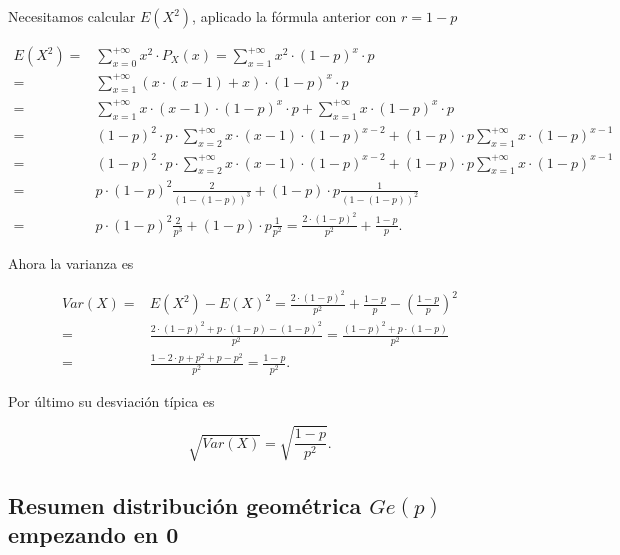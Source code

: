 \documentclass[
  letterpaper,
  DIV=11,
  numbers=noendperiod]{scrreprt}
\begin{document}
Necesitamos calcular \(E(X^2)\), aplicado la fórmula anterior con
\(r=1-p\)

\begin{align*}
E(X^2)
=&\sum_{x=0}^{+\infty} x^2\cdot P_X(x)=\sum_{x=1}^{+\infty} x^2\cdot (1-p)^x\cdot p
\\
=& 
\sum_{x=1}^{+\infty} (x\cdot (x-1)+x)\cdot (1-p)^{x}\cdot p\\
=&
 \sum_{x=1}^{+\infty} x\cdot (x-1)\cdot (1-p)^{x}\cdot p + \sum_{x=1}^{+\infty} x \cdot (1-p)^{x}\cdot p\\
=&
 (1-p)^{2}\cdot p\cdot \sum_{x=2}^{+\infty} x\cdot (x-1)\cdot (1-p)^{x-2} + (1-p)\cdot p\sum_{x=1}^{+\infty} x \cdot (1-p)^{x-1}\\ 
=&
 (1-p)^{2}\cdot p\cdot \sum_{x=2}^{+\infty} x\cdot (x-1)\cdot (1-p)^{x-2}
 +(1-p)\cdot p\sum_{x=1}^{+\infty} x \cdot (1-p)^{x-1}\\
=&
 p\cdot (1-p)^2 \frac{2}{(1-(1-p))^3}+ (1-p)\cdot p \frac{1}{(1-(1-p))^2}\\
=&
p\cdot (1-p)^2 \frac{2}{p^3}+ (1-p)\cdot p \frac{1}{p^2}=\frac{2\cdot (1-p)^2}{p^2}+\frac{1-p}{p}.
\end{align*}

Ahora la varianza es

\begin{align*}
Var(X)=& E(X^2)-E(X)^2=\frac{2\cdot (1-p)^2}{p^2}+\frac{1-p}{p}-\left(\frac{1-p}{p}\right)^2\\
=&
\frac{2\cdot (1-p)^2+p\cdot(1-p)-(1-p)^2}{p^2}=\frac{(1-p)^2+p\cdot(1-p)}{p^2}\\
=&
\frac{1-2\cdot p + p^2+p-p^2}{p^2}= \frac{1-p}{p^2}.
\end{align*}

Por último su desviación típica es

\[\sqrt{Var(X)}=\sqrt{\frac{1-p}{p^2}}.\]

\subsection{\texorpdfstring{Resumen distribución geométrica \(Ge(p)\)
empezando en
0}{Resumen distribución geométrica Ge(p) empezando en 0}}\label{resumen-distribuciuxf3n-geomuxe9trica-gep-empezando-en-0}
\end{document}

